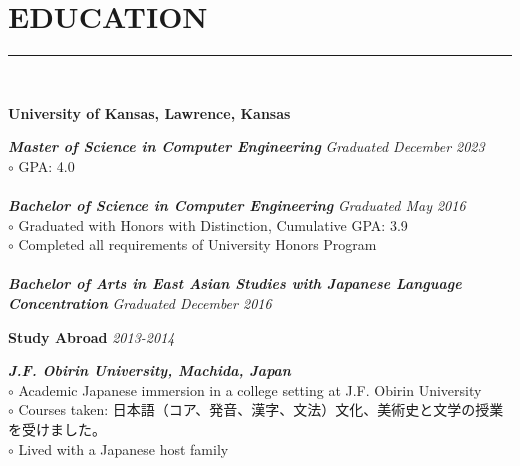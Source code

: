 \documentclass[twoside]{article}
\begin{document}
\section*{EDUCATION}
\vspace{-1em}
\rule{\textwidth}{1pt}\\
\begin{adjustwidth}{0.2in}{0in}
\vspace{-1em}
\textbf{University of Kansas, Lawrence, Kansas}\\
\end{adjustwidth}
\begin{adjustwidth}{0.4in}{0in}
\vspace{-1em}
\textbf{\emph{Master of Science in Computer Engineering}} \hfill \textit{Graduated December 2023}\\
$\circ$ GPA: 4.0\\\\
\textbf{\emph{Bachelor of Science in Computer Engineering}} \hfill \textit{Graduated May 2016}\\
$\circ$ Graduated with Honors with Distinction, Cumulative GPA: 3.9\\
$\circ$ Completed all requirements of University Honors Program\\\\
\textbf{\emph{Bachelor of Arts in East Asian Studies with Japanese Language Concentration}} \hfill \textit{Graduated December 2016}\\
\end{adjustwidth}
\begin{adjustwidth}{0.2in}{0in}
\textbf{Study Abroad} \hfill \textit{2013-2014}\\
\end{adjustwidth}
\vspace{-1em}
\begin{adjustwidth}{0.4in}{0in}
\textbf{\emph{J.F. Obirin University, Machida, Japan}}\\
$\circ$ Academic Japanese immersion in a college setting at J.F. Obirin University\\
$\circ$ Courses taken: 日本語（コア、発音、漢字、文法）文化、美術史と文学の授業を受けました。\\
$\circ$ Lived with a Japanese host family\\
\end{adjustwidth}
\end{document}
